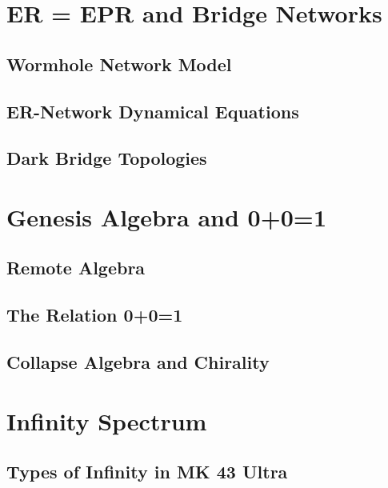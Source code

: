 \section{ER = EPR and Bridge Networks}
\label{app:er-epr}

\subsection{Wormhole Network Model}

\subsection{ER-Network Dynamical Equations}

\subsection{Dark Bridge Topologies}

\section{Genesis Algebra and 0+0=1}
\label{app:genesis-algebra}

\subsection{Remote Algebra}

\subsection{The Relation 0+0=1}

\subsection{Collapse Algebra and Chirality}

\section{Infinity Spectrum}
\label{app:infinity-spectrum}

\subsection{Types of Infinity in MK 43 Ultra}

